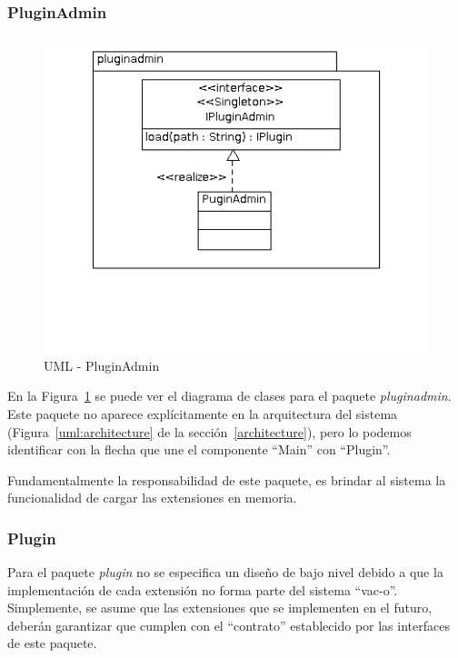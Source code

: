   \subsubsection{PluginAdmin}
  \begin{figure}
      \centering
      \includegraphics[scale=0.5]{lld-pluginadmin.png}  
      \caption{UML - PluginAdmin}
      \label{uml:lld-pluginadmin}
    \end{figure}

  En la Figura~\ref{uml:lld-pluginadmin} se puede ver el diagrama de clases
para el paquete \textit{pluginadmin}. Este paquete no aparece expl\'icitamente
en la arquitectura del sistema (Figura~\ref{uml:architecture} de la
secci\'on~\ref{architecture}), pero lo podemos identificar con la flecha que une
el componente ``Main'' con ``Plugin''.

  Fundamentalmente la responsabilidad de este paquete, es brindar al sistema la
funcionalidad de cargar las extensiones en memoria.

  \subsubsection{Plugin}
  Para el paquete \textit{plugin} no se especifica un dise\~no de bajo nivel
debido a que la implementaci\'on de cada extensi\'on no forma parte del sistema
``vac-o''. Simplemente, se asume que las extensiones que se implementen en el
futuro, deber\'an garantizar que cumplen con el ``contrato'' establecido por
las interfaces de este paquete.
